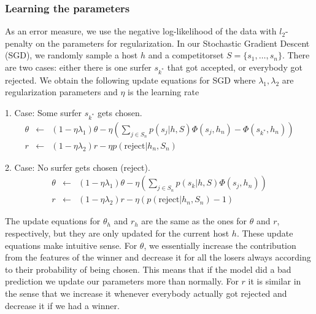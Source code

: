 \subsubsection{Learning the parameters}
As an error measure, we use the negative log-likelihood of the data with $l_2$-penalty on the parameters for regularization.
In our Stochastic Gradient Descent (SGD), we randomly sample a host $h$ and a competitorset $S=\{ s_1, \dots, s_n\}$.
There are two cases: either there is one surfer $s_{k^*}$ that got accepted, or everybody got rejected.
We obtain the following update equations for SGD where $\lambda_1, \lambda_2$ are regularization parameters and $\eta$ is the learning rate

1. Case: Some surfer $s_{k^*}$ gets chosen.
\begin{eqnarray}
\theta &\leftarrow& (1- \eta \lambda_1) \theta - \eta (\sum_{j \in S_n} p(s_j | h, S) \Phi(s_j,h_n) - \Phi(s_{k^*},h_n))\\
r &\leftarrow& (1- \eta \lambda_2) r - \eta p(\text{reject} | h_n, S_n)
\end{eqnarray}

2. Case: No surfer gets chosen (reject).
\begin{eqnarray}
\theta &\leftarrow& (1- \eta \lambda_1) \theta - \eta (\sum_{j \in S_n} p(s_k | h, S) \Phi(s_j,h_n))\\
r &\leftarrow& (1- \eta \lambda_2) r - \eta (p(\text{reject} | h_n, S_n)-1)
\end{eqnarray}

The update equations for $\theta_h$ and $r_h$ are the same as the ones for $\theta$ and $r$, respectively, but they are only updated for the current host $h$.
These update equations make intuitive sense.
For $\theta$, we essentially increase the contribution from the features of the winner and decrease it for all the losers always according to their probability of being chosen.
This means that if the model did a bad prediction we update our parameters more than normally.
For $r$ it is similar in the sense that we increase it whenever everybody actually got rejected and decrease it if we had a winner.

